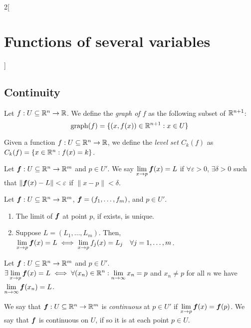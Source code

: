 \documentclass[../../../main.tex]{subfiles}
\begin{document}
\begin{multicols}{2}[\section{Functions of several variables}]
  \subsection{Continuity}
  \begin{definition}
    Let $f:U\subseteq\mathbb{R}^n\rightarrow\mathbb{R} $. We define the \textit{graph of $f$} as the following subset of $\mathbb{R}^{n+1}$: $$\text{graph}(f)=\{(x,f(x))\in\mathbb{R}^{n+1}:x\in U\}$$
  \end{definition}
  \begin{definition}
    Given a function $f:U\subseteq\mathbb{R}^n\rightarrow\mathbb{R} $, we define the \textit{level set $C_k(f)$} as $C_k(f)=\{x\in\mathbb{R}^n:f(x)=k\}$.
  \end{definition}
  \begin{definition}
    Let $\boldsymbol{f}:U\subseteq\mathbb{R}^n\rightarrow\mathbb{R}^m$ and $p\in U'$. We say $\displaystyle\lim_{x\to p}\boldsymbol{f}(x)=L$ if $\forall\varepsilon>0$, $\exists\delta>0$ such that $\|\boldsymbol{f}(x)-L\|<\varepsilon$ if $\|x-p\|<\delta$.
  \end{definition}
  \begin{prop}
    Let $\boldsymbol{f}:U\subseteq\mathbb{R}^n\rightarrow\mathbb{R}^m$, $\boldsymbol{f}=(f_1,\ldots,f_m)$, and $p\in U'$.
    \begin{enumerate}
      \item The limit of $\boldsymbol{f}$ at point $p$, if exists, is unique.
      \item Suppose $L=(L_1,\ldots,L_m)$. Then, $\displaystyle\lim_{x\to p}\boldsymbol{f}(x)=L\iff\lim_{x\to p}f_j(x)=L_j\quad\forall j=1,\ldots,m$.
    \end{enumerate}
  \end{prop}
  \begin{lemma}
    Let $\boldsymbol{f}:U\subseteq\mathbb{R}^n\rightarrow\mathbb{R}^m$ and $p\in U'$. $\displaystyle\exists\lim_{x\to p}\boldsymbol{f}(x)=L\iff\forall(x_n)\in\mathbb{R}^n:\lim_{n\to\infty}x_n=p$ and $x_n\ne p$ for all $n$ we have $\displaystyle\lim_{n\to \infty}\boldsymbol{f}(x_n)=L$.
  \end{lemma}
  \begin{definition}
    We say that $\boldsymbol{f}:U\subseteq\mathbb{R}^n\rightarrow\mathbb{R}^m$ is \textit{continuous} at $p\in U'$ if $\displaystyle\lim_{x\to p}\boldsymbol{f}(x)=\boldsymbol{f}(p)$. We say that $\boldsymbol{f}$ is continuous on $U$, if so it is at each point $p\in U$.
  \end{definition}
  \begin{definition}

\end{definition}
\end{multicols}
\end{document}
